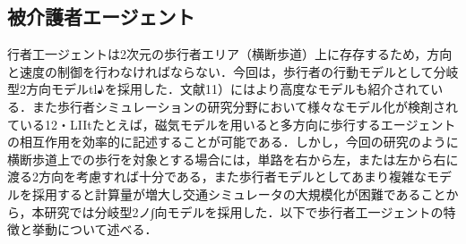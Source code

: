 \subsection{被介護者エージェント}

行者工一ジェントは2次元の歩行者エリア（横断歩道）上に存存するため，方向と速度の制御を行わなければならない．今回は，歩行者の行動モデルとして分岐型2方向モデルtl♪を採用した．文献11）にはより高度なモデルも紹介されている．また歩行者シミュレーションの研究分野において様々なモデル化が検剤されている12・LIItたとえば，磁気モデルを用いると多方向に歩行するエージェントの相互作用を効率的に記述することが可能である．しかし，今回の研究のように横断歩道上での歩行を対象とする場合には，単路を右から左，または左から右に渡る2方向を考慮すれば十分である，また歩行者モデルとしてあまり複雑なモデルを採用すると計算量が増大し交通シミュレータの大規模化が困難であることから，本研究では分岐型2ノ∫向モデルを採用した．以下で歩行者工一ジェントの特徴と挙動について述べる．
